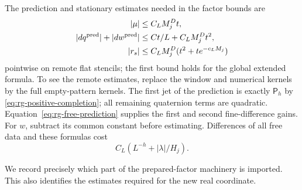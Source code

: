 The prediction and stationary estimates needed in the factor bounds are
\begin{equation}
 \begin{split}
 |\mu|&\le C_LM_j^Dt,\\
 |d q^{\rm pred}|+|d w^{\rm pred}|&\le Ct/L+C_LM_j^Dt^2,\\
 |r_s|&\le C_LM_j^D(t^2+te^{-c_LM_j})
 \end{split}
 \label{eq:rg-prediction-local}
\end{equation}
pointwise on remote flat stencils; the first bound holds for the global
extended formula.  To see the remote estimates, replace the window and numerical
kernels by the full empty-pattern kernels.  The first jet of the
prediction is exactly $\mathsf P_h$ by
\eqref{eq:rg-positive-completion}; all remaining quaternion terms are
quadratic.  Equation~\eqref{eq:rg-free-prediction} supplies the first
and second fine-difference gains.  For $w$, subtract its common constant
before estimating.  Differences of all free data and these formulas
cost
\[
                        C_L(L^{-h}+|\lambda|/H_j).
\]

We record precisely which part of the prepared-factor machinery is
imported.  This also identifies the estimates required for the new real
coordinate.

